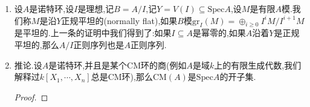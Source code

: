 \begin{enumerate}
\begin{proof}
    	\qquad
    	
    	于是如果适当把$A$替换为更小的主开集上(比方说,对包含$\mathfrak{p}$的素理想$\mathfrak{q}$,取$\mathfrak{q}-\mathfrak{p}$中的元取主开集,对$I$的其它极小素理想$\mathfrak{q}$,也取$\mathfrak{q}-\mathfrak{p}$中的元取主开集),我们不妨设$\mathfrak{p}$是$A/(y_1,\cdots,y_n)A$的唯一伴随素理想,换句话讲$I=(y_1,\cdots,y_n)A$是$\mathfrak{p}$准素理想.
    	
    	\qquad
    	
    	下面设$\mathfrak{q}\in V(\mathfrak{p})=\mathrm{Spec}(A/\mathfrak{p})=\mathrm{Spec}(A/I)$.那么我们解释过$A_{\mathfrak{q}}$是CM环当且仅当模去正则序列也是CM环,也即$A_{\mathfrak{q}}/IA_{\mathfrak{q}}$是CM的.于是不妨用$A/I$替换$A$,归结为设$(0)$是$\mathfrak{p}$准素理想,并且此时$\mathfrak{p}$是$A$的唯一极小素理想.那么诺特条件保证存在某个正整数$r$使得$\mathfrak{p}^r=0$.考虑链$0=\mathfrak{p}^r\subseteq\mathfrak{p}^{r-1}\subseteq\cdots\subseteq\mathfrak{p}\subseteq A$.这里每个$\mathfrak{p}^i/\mathfrak{p}^{i+1}$都是有限$A/\mathfrak{p}$模,这里$A/\mathfrak{p}$是整环.于是再限制在更小的主开集上可以约定每个$\mathfrak{p}^i/\mathfrak{p}^{i+1}$都是$A/\mathfrak{p}$上的自由模.此时如果$x_1,\cdots,x_m\in A$是$A/\mathfrak{p}$正则序列,那么它也是$A$正则序列(上面引理).于是有$\mathrm{depth}(A_{\mathfrak{q}})\ge\mathrm{depth}(A_{\mathfrak{q}}/\mathfrak{p}A_{\mathfrak{q}})$对任意$\mathfrak{q}\in V(\mathfrak{p})=\mathrm{Spec}A$成立.
    	
    	\qquad
    	
    	但是按照Nagata准则的条件,这里$\mathrm{CM}(A/\mathfrak{p})$包含了$\mathrm{Spec}A/\mathfrak{p}$的某个开子集,所以适当传递给某个包含在这个开集中的主开集,我们可设$A/\mathfrak{p}$本身就是CM环.于是对任意$\mathfrak{q}\in V(\mathfrak{p})=\mathrm{Spec}(A)$,就有$A_{\mathfrak{q}}/\mathfrak{p}A_{\mathfrak{q}}$是CM的,于是上述等式得到$\mathrm{depth}(A_{\mathfrak{q}})\ge\mathrm{depth}(A_{\mathfrak{q}}/\mathfrak{p}A_{\mathfrak{q}})=\dim(A_{\mathfrak{q}}/\mathfrak{p}A_{\mathfrak{q}})=\dim(A_{\mathfrak{q}})$,这说明$A_{\mathfrak{q}}$是CM环,于是$U=V(\mathfrak{p})=\mathrm{Spec}A$.完成拓扑Nagata准则第二条的验证.
    \end{proof}
    \item 设$A$是诺特环,设$I$是理想,记$B=A/I$,记$Y=V(I)\subseteq\mathrm{Spec}A$,设$M$是有限$A$模.我们称$M$是沿$Y$正规平坦的(normally flat),如果$B$模$\mathrm{gr}_I(M)=\oplus_{i\ge0}I^iM/I^{i+1}M$是平坦的.上一条的证明中我们得到了:如果$I\subseteq A$是幂零的,如果$A$沿着$Y$是正规平坦的,那么$A/I$正则序列也是$A$正则序列.
    \item 推论.设$A$是诺特环,并且是某个CM环的商(例如$A$是域$k$上的有限生成代数,我们解释过$k[X_1,\cdots,X_n]$总是CM环),那么$\mathrm{CM}(A)$是$\mathrm{Spec}A$的开子集.
    \begin{proof}
    	

\end{proof}
\end{enumerate}
